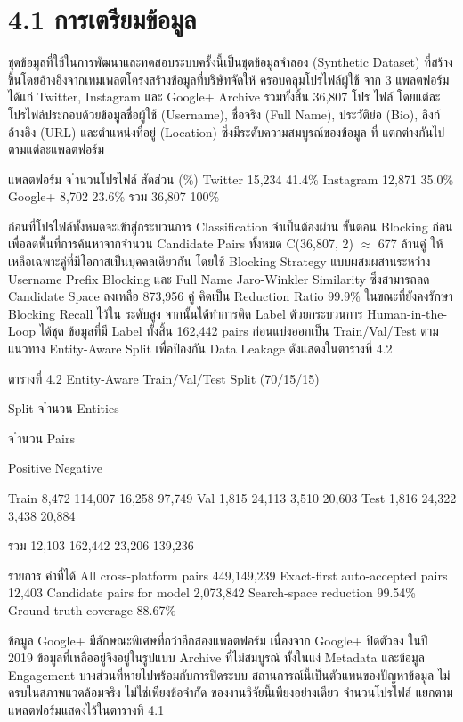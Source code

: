 \documentclass[12pt,a4paper]{report}
\begin{document}
\section*{4.1 การเตรียมข้อมูล}
ชุดข้อมูลที่ใช้ในการพัฒนาและทดสอบระบบครั้งนี้เป็นชุดข้อมูลจำลอง (Synthetic Dataset) ที่สร้างขึ้นโดยอ้างอิงจากเทมเพลตโครงสร้างข้อมูลที่บริษัทจัดให้ ครอบคลุมโปรไฟล์ผู้ใช้ จาก 3 แพลตฟอร์ม ได้แก่ Twitter, Instagram และ Google+ Archive รวมทั้งสิ้น 36,807 โปร ไฟล์ โดยแต่ละโปรไฟล์ประกอบด้วยข้อมูลชื่อผู้ใช้ (Username), ชื่อจริง (Full Name), ประวัติย่อ (Bio), ลิงก์อ้างอิง (URL) และตำแหน่งที่อยู่ (Location) ซึ่งมีระดับความสมบูรณ์ของข้อมูล ที่ แตกต่างกันไปตามแต่ละแพลตฟอร์ม\par
แพลตฟอร์ม จ ำนวนโปรไฟล์ สัดส่วน (\%) Twitter 15,234 41.4\% Instagram 12,871 35.0\% Google+ 8,702 23.6\% รวม 36,807 100\%\par
ก่อนที่โปรไฟล์ทั้งหมดจะเข้าสู่กระบวนการ Classification จำเป็นต้องผ่าน ขั้นตอน Blocking ก่อน เพื่อลดพื้นที่การค้นหาจากจำนวน Candidate Pairs ทั้งหมด C(36,807, 2) \ensuremath{\approx} 677 ล้านคู่ ให้เหลือเฉพาะคู่ที่มีโอกาสเป็นบุคคลเดียวกัน โดยใช้ Blocking Strategy แบบผสมผสานระหว่าง Username Prefix Blocking และ Full Name Jaro-Winkler Similarity ซึ่งสามารถลด Candidate Space ลงเหลือ 873,956 คู่ คิดเป็น Reduction Ratio 99.9\% ในขณะที่ยังคงรักษา Blocking Recall ไว้ใน ระดับสูง จากนั้นได้ทำการติด Label ด้วยกระบวนการ Human-in-the-Loop ได้ชุด ข้อมูลที่มี Label ทั้งสิ้น 162,442 pairs ก่อนแบ่งออกเป็น Train/Val/Test ตามแนวทาง Entity-Aware Split เพื่อป้องกัน Data Leakage ดังแสดงในตารางที่ 4.2\par
\begin{center}\small ตารางที่ 4.2 Entity-Aware Train/Val/Test Split (70/15/15)\end{center}
Split จ ำนวน Entities\par
จ ำนวน Pairs\par
Positive Negative\par
Train 8,472 114,007 16,258 97,749 Val 1,815 24,113 3,510 20,603 Test 1,816 24,322 3,438 20,884\par
\clearpage
รวม 12,103 162,442 23,206 139,236\par
รายการ ค่าที่ได้ All cross-platform pairs 449,149,239 Exact-first auto-accepted pairs 12,403 Candidate pairs for model 2,073,842 Search-space reduction 99.54\% Ground-truth coverage 88.67\%\par
ข้อมูล Google+ มีลักษณะพิเศษที่กว่าอีกสองแพลตฟอร์ม เนื่องจาก Google+ ปิดตัวลง ในปี 2019 ข้อมูลที่เหลืออยู่จึงอยู่ในรูปแบบ Archive ที่ไม่สมบูรณ์ ทั้งในแง่ Metadata และข้อมูล Engagement บางส่วนที่หายไปพร้อมกับการปิดระบบ สถานการณ์นี้เป็นตัวแทนของปัญหาข้อมูล ไม่ครบในสภาพแวดล้อมจริง ไม่ใช่เพียงข้อจำกัด ของงานวิจัยนี้เพียงอย่างเดียว จำนวนโปรไฟล์ แยกตามแพลตฟอร์มแสดงไว้ในตารางที่ 4.1\par
\end{document}
